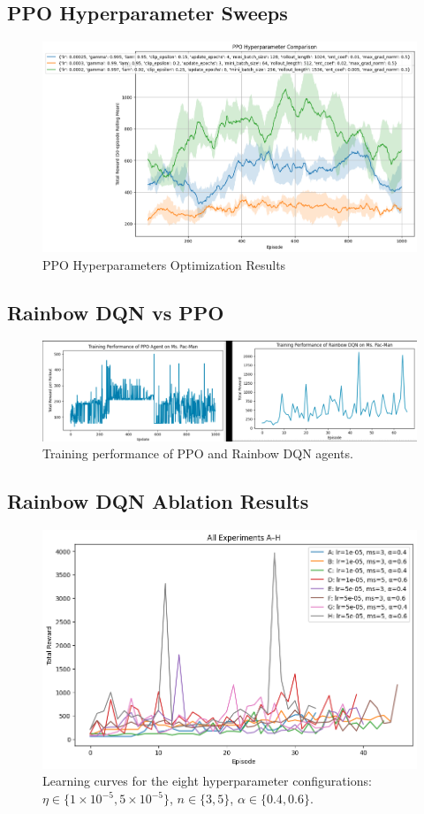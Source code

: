 \documentclass{article}
\begin{document}
\subsection{PPO Hyperparameter Sweeps}
\begin{figure}[H]
  \centering
  \includegraphics[width=\linewidth]{PPO_output_hyperparameters_3set.png}
  \caption{PPO Hyperparameters Optimization Results}
  \label{fig:ppo_hyperparams}
\end{figure}

\subsection{Rainbow DQN vs PPO}
\begin{figure}[H]
  \centering
  \includegraphics[width=0.85\linewidth]{rainbow_vs_ppo.png}
  \caption{Training performance of PPO and Rainbow DQN agents.}
  \label{fig:ppo_vs_rainbow}
\end{figure}

\subsection{Rainbow DQN Ablation Results}
\begin{figure}[H]
  \centering
  \includegraphics[width=0.8\linewidth]{rainbow_8Regular.png}
  \caption{Learning curves for the eight hyperparameter configurations:
           \(\eta\in\{1\times10^{-5},5\times10^{-5}\}\), 
           \(n\in\{3,5\}\), 
           \(\alpha\in\{0.4,0.6\}\).}
  \label{fig:ablation}
\end{figure}
\end{document}
